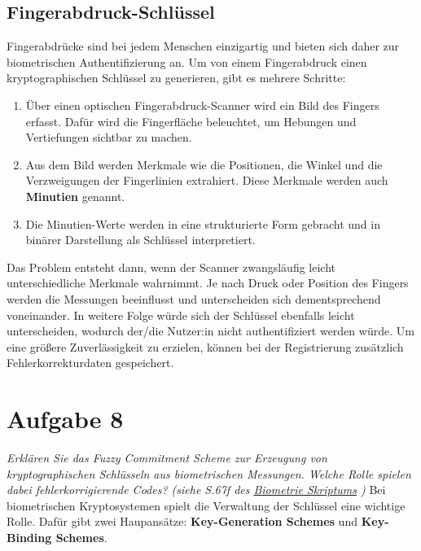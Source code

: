 \documentclass{article}
\begin{document}
    \subsection{Fingerabdruck-Schlüssel}
    Fingerabdrücke sind bei jedem Menschen einzigartig und bieten sich daher zur biometrischen Authentifizierung an.
    Um von einem Fingerabdruck einen kryptographischen Schlüssel zu generieren, gibt es mehrere Schritte:
    \begin{enumerate}
        \item Über einen optischen Fingerabdruck-Scanner wird ein Bild des Fingers erfasst. Dafür wird
        die Fingerfläche beleuchtet, um Hebungen und Vertiefungen sichtbar zu machen.
        \item Aus dem Bild werden Merkmale wie die Positionen, die Winkel und die Verzweigungen der Fingerlinien extrahiert.
        Diese Merkmale werden auch \textbf{Minutien} genannt.
        \item Die Minutien-Werte werden in eine strukturierte Form gebracht und in binärer Darstellung als Schlüssel interpretiert.
    \end{enumerate}
    Das Problem entsteht dann, wenn der Scanner zwangsläufig leicht unterschiedliche Merkmale wahrnimmt. Je nach 
    Druck oder Position des Fingers werden die Messungen beeinflusst und unterscheiden sich dementsprechend voneinander.
    In weitere Folge würde sich der Schlüssel ebenfalls leicht unterscheiden, wodurch der/die Nutzer:in nicht
    authentifiziert werden würde. Um eine größere Zuverlässigkeit zu erzielen, können bei der Registrierung 
    zusätzlich Fehlerkorrekturdaten gespeichert.
    \section{Aufgabe 8}
    \textit{Erklären Sie das Fuzzy Commitment Scheme zur Erzeugung von kryptographischen Schlüsseln aus 
    biometrischen Messungen. Welche Rolle spielen dabei fehlerkorrigierende Codes? (siehe S.67f des 
    \href{https://www.cosy.sbg.ac.at/~uhl/biometrics_slides.pdf}{Biometrie Skriptums} \cite{Uhl2016})}\vspace*{1em}\newline
    Bei biometrischen Kryptosystemen spielt die Verwaltung der Schlüssel eine wichtige Rolle. Dafür gibt zwei
    Haupansätze: \textbf{Key-Generation Schemes} und \textbf{Key-Binding Schemes}.
\end{document}
